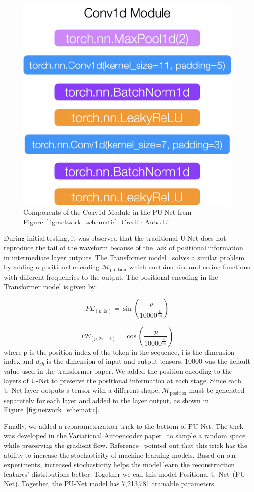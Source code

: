 \begin{figure}[htb!]
    \centering
    \includegraphics[width=0.3\linewidth,trim={0pc 0pc 0pc 0pc},clip]{ch6/figs/conv1d.png}
    \caption{Components of the Conv1d Module in the PU-Net from Figure~\ref{fig:network_schematic}.  Credit: Aobo Li}
    \label{ch6:fig:cov1d_break_down}
\end{figure}

During initial testing, it was observed that the traditional U-Net does not reproduce the tail of the waveform because of the lack of positional information in intermediate layer outputs. The Transformer model~\cite{Transformer} solves a similar problem by adding a positional encoding $\mathcal{M}_{\mathrm{position}}$ which contains sine and cosine functions with different frequencies to the output. The positional encoding in the Transformer model is given by:

\begin{equation}
PE_{(p, 2i)} = \sin\left(\frac{p}{10000^{\frac{2i}{d_{\text{ch}}}}}\right)
\label{eqn:positional_encoding_sin}
\end{equation}

\begin{equation}
PE_{(p, 2i+1)} = \cos\left(\frac{p}{10000^{\frac{2i}{d_{\text{ch}}}}}\right)
\label{eqn:positional_encoding_cos}
\end{equation}
where p is the position index of the token in the sequence, i is the dimension index and $d_{ch}$ is the dimension of input and output tensors. 10000 was the default value used in the transformer paper. We added the position encoding to the layers of U-Net to preserve the positional information at each stage. Since each U-Net layer outputs a tensor with a different shape, $\mathcal{M}_{\mathrm{position}}$ must be generated separately for each layer and added to the layer output, as shown in Figure~\ref{fig:network_schematic}.



Finally, we added a reparametrization trick to the bottom of PU-Net. The trick was developed in the Variational Autoencoder paper~\cite{VAE} to sample a random space while preserving the gradient flow. Reference~\cite{AAE} pointed out that this trick has the ability to increase the stochasticity of machine learning models. Based on our experiments, increased stochasticity helps the model learn the reconstruction features' distributions better. Together we call this model Positional U-Net~(PU-Net). Together, the PU-Net model has 7,213,781 trainable parameters.

